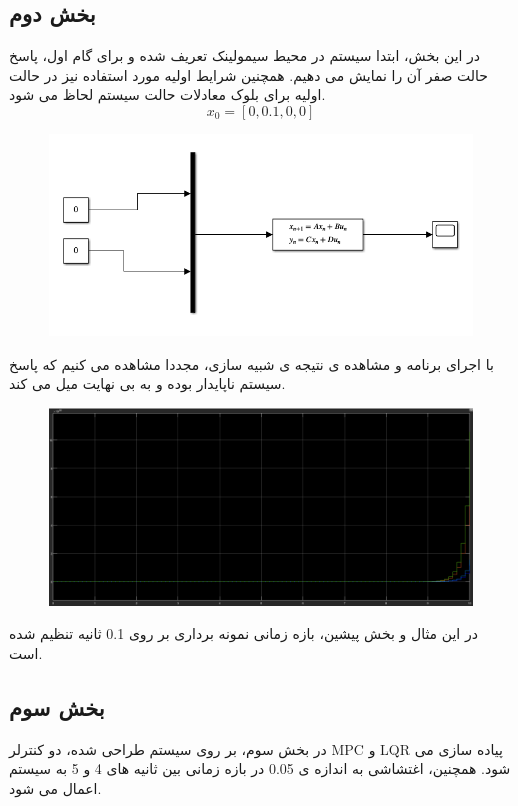 \subsection{بخش دوم}
	در این بخش، ابتدا سیستم در محیط سیمولینک تعریف شده و برای گام اول، پاسخ حالت صفر آن را نمایش می دهیم. همچنین شرایط اولیه مورد استفاده نیز در حالت اولیه برای بلوک معادلات حالت سیستم لحاظ می شود.
	\[
	x_0 = [0, 0.1, 0, 0]
	\]
	
\begin{figure}[H]
	\centering
	\includegraphics[width=0.7\linewidth]{../img/system_Zero_Responce_Simulink}
	\caption{}
	\label{fig:systemzeroresponcesimulink}
\end{figure}

با اجرای برنامه و مشاهده ی نتیجه ی شبیه سازی، مجددا مشاهده می کنیم که پاسخ سیستم ناپایدار بوده و به بی نهایت میل می کند.
	
 
\begin{figure}[H]
	\centering
	\includegraphics[width=1\linewidth]{../img/Q2_Zero_Response}
	\caption{}
	\label{fig:q3zeroresponse}
\end{figure}
 
 در این مثال و بخش پیشین، بازه زمانی نمونه برداری بر روی 0.1 ثانیه تنظیم شده است.
 
 \subsection{بخش سوم}
 در بخش سوم، بر روی سیستم طراحی شده، دو کنترلر MPC و LQR پیاده سازی می شود. همچنین، اغتشاشی به اندازه ی 0.05 در بازه زمانی بین ثانیه های 4 و 5 به سیستم اعمال می شود. 
 
